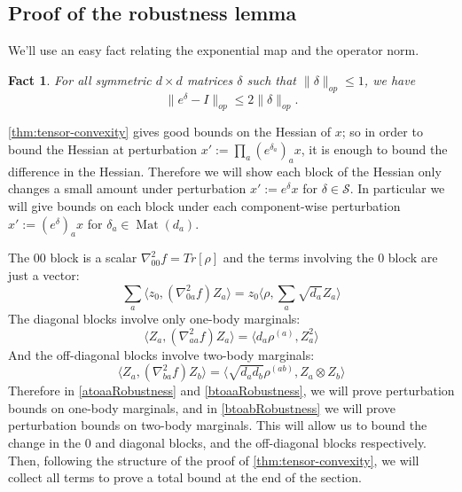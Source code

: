 \documentclass[aos]{imsart}
\newtheorem{fact}[theorem]{Fact}
\theoremstyle{definition}
\numberwithin{equation}{section}
\DeclareMathOperator{\Mat}{Mat}
\DeclareMathOperator{\tr}{Tr}
\newcommand{\Sym}{\mathcal{S}}
\newcommand{\samp}{x}
\newcommand{\CF}[1]{{\color{purple}[CF: #1]}}
\begin{document}
\begin{appendix}
\section{Proof of the robustness lemma}\label{app:robust}
We'll use an easy fact relating the exponential map and the operator norm.

\begin{fact} \label{f:expTaylor} For all symmetric $d\times d$ matrices $\delta $ such that $ \|\delta\|_{op} \leq 1$, we have
$$ \|e^{\delta} - I\|_{op} \leq 2 \|\delta\|_{op}.$$
\end{fact}

\cref{thm:tensor-convexity} gives good bounds on the Hessian of $\samp$; so in order to bound the Hessian at perturbation $\samp' := \prod_{a} (e^{\delta_{a}})_{a} \samp$, it is enough to bound the difference in the Hessian.
Therefore we will show each block of the Hessian only changes a small amount under perturbation $x' := e^{\delta} x$ for $\delta \in \Sym$. In particular we will give bounds on each block under each component-wise perturbation $x' := (e^{\delta})_{a} x$ for $\delta_{a} \in \Mat(d_{a})$.


The $00$ block is a scalar $\nabla^{2}_{00} f = Tr[\rho]$ and the terms involving the $0$ block are just a vector:
\[ \sum_{a} \langle z_{0}, (\nabla^{2}_{0a} f) Z_{a} \rangle = z_{0} \langle \rho, \sum_{a} \sqrt{d_{a}} Z_{a} \rangle       \]
The diagonal blocks involve only one-body marginals:
\[ \langle Z_{a}, (\nabla^{2}_{aa} f) Z_{a} \rangle = \langle d_{a} \rho^{(a)}, Z_{a}^{2} \rangle       \]
And the off-diagonal blocks involve two-body marginals:
\[ \langle Z_{a}, (\nabla^{2}_{ba} f) Z_{b} \rangle =  \langle \sqrt{d_{a} d_{b}} \rho^{(ab)}, Z_{a} \otimes Z_{b} \rangle   \]
Therefore in \cref{atoaaRobustness} and \cref{btoaaRobustness}, we will prove perturbation bounds on one-body marginals, and in \cref{btoabRobustness} we will prove perturbation bounds on two-body marginals. This will allow us to bound the change in the $0$ and diagonal blocks, and the off-diagonal blocks respectively. Then, following the structure of the proof of \cref{thm:tensor-convexity}, we will collect all terms to prove a total bound at the end of the section.



\end{appendix}
\end{document}
